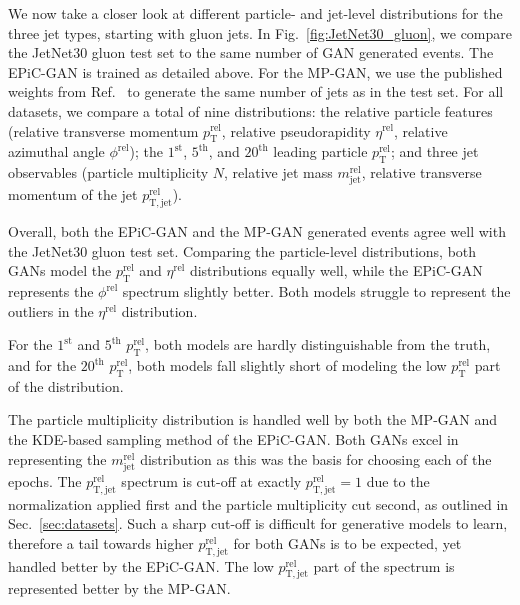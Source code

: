 \documentclass[a4paper,submission, Phys]{SciPost}
\DeclareRobustCommand{\Sec}[1]{Sec.~\ref{sec:#1}}
\DeclareRobustCommand{\Fig}[1]{Fig.~\ref{fig:#1}}
\DeclareRobustCommand{\Reff}[1]{Ref.~\cite{#1}}
\begin{document}
%
We now take a closer look at different particle- and jet-level distributions for the three jet types, starting with gluon jets. 
%
In \Fig{JetNet30_gluon}, we compare the JetNet30 gluon test set to the same number of GAN generated events. 
%
The EPiC-GAN is trained as detailed above.
%
For the MP-GAN, we use the published weights from \Reff{MPGAN} to generate the same number of jets as in the test set. 
%
For all datasets, we compare a total of nine distributions: 
%
the relative particle features (relative transverse momentum $p_\mathrm{T}^\mathrm{rel}$, relative pseudorapidity $\eta^\mathrm{rel}$, relative azimuthal angle $\phi^\mathrm{rel}$); the $1^\mathrm{st}$, $5^\mathrm{th}$, and $20^\mathrm{th}$ leading particle $p_\mathrm{T}^\mathrm{rel}$; and three jet observables (particle multiplicity $N$, relative jet mass $m_\mathrm{jet}^\mathrm{rel}$, relative transverse momentum of the jet $p_\mathrm{T,jet}^\mathrm{rel}$).


Overall, both the EPiC-GAN and the MP-GAN generated events agree well with the JetNet30 gluon test set. 
%
Comparing the particle-level distributions, both GANs model the $p_\mathrm{T}^\mathrm{rel}$ and $\eta^\mathrm{rel}$ distributions equally well, while the EPiC-GAN represents the $\phi^\mathrm{rel}$ spectrum slightly better. 
%
Both models struggle to represent the outliers in the $\eta^\mathrm{rel}$ distribution. 


For the $1^\mathrm{st}$ and $5^\mathrm{th}$ $p_\mathrm{T}^\mathrm{rel}$, both models are hardly distinguishable from the truth, and for the $20^\mathrm{th}$ $p_\mathrm{T}^\mathrm{rel}$, both models fall slightly short of modeling the low $p_\mathrm{T}^\mathrm{rel}$ part of the distribution. 

The particle multiplicity distribution is handled well by both the MP-GAN and the KDE-based sampling method of the EPiC-GAN. 
%
Both GANs excel in representing the $m_\mathrm{jet}^\mathrm{rel}$ distribution as this was the basis for choosing each of the epochs. 
%
The $p_\mathrm{T,jet}^\mathrm{rel}$ spectrum is cut-off at exactly $p_\mathrm{T,jet}^\mathrm{rel} = 1$ due to the normalization applied first and the particle multiplicity cut second, as outlined in \Sec{datasets}. 
%
Such a sharp cut-off is difficult for generative models to learn, therefore a tail towards higher $p_\mathrm{T,jet}^\mathrm{rel}$ for both GANs is to be expected, yet handled better by the EPiC-GAN.
%
The low $p_\mathrm{T,jet}^\mathrm{rel}$ part of the spectrum is represented better by the MP-GAN. 
\end{document}
